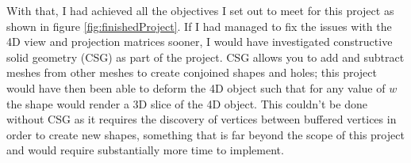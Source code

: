 \documentclass[11pt, a4paper]{article}
\begin{document}
With that, I had achieved all the objectives I set out to meet for this project as shown in figure \ref{fig:finishedProject}. If I had managed to fix the issues with the 4D view and projection matrices sooner, I would have investigated constructive solid geometry (CSG) as part of the project. CSG allows you to add and subtract meshes from other meshes to create conjoined shapes and holes; this project would have then been able to deform the 4D object such that for any value of $w$ the shape would render a 3D slice of the 4D object. This couldn't be done without CSG as it requires the discovery of vertices between buffered vertices in order to create new shapes, something that is far beyond the scope of this project and would require substantially more time to implement.

\cleardoublepage
\printbibliography[
  heading=bibintoc,
  title={Bibliography}
]
\end{document}
